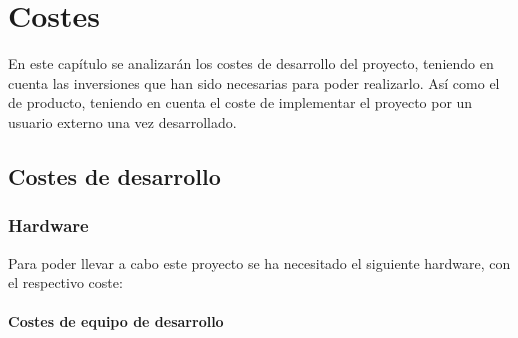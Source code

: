 \chapter{Costes}
En este capítulo se analizarán los costes de desarrollo del proyecto, teniendo
en cuenta las inversiones que han sido necesarias para poder realizarlo. Así
como el de producto, teniendo en cuenta el coste de implementar el
proyecto por un usuario externo una vez desarrollado.

\section{Costes de desarrollo}

\subsection{Hardware}

Para poder llevar a cabo este proyecto se ha necesitado el siguiente hardware,
con el respectivo coste:

\subsubsection{Costes de equipo de desarrollo}

